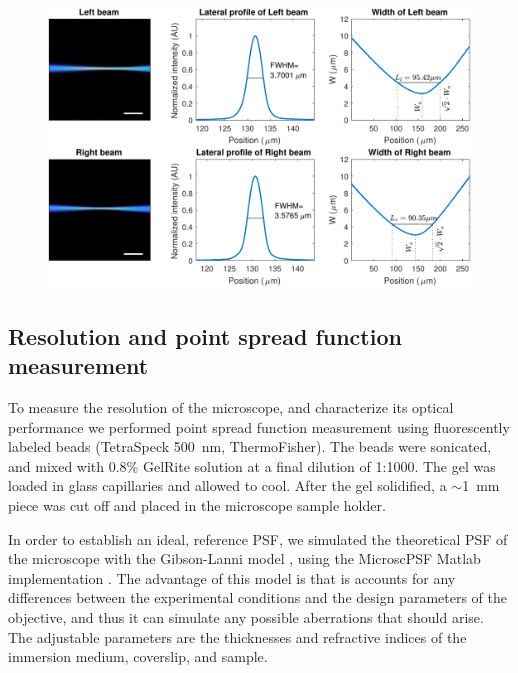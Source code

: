     \begin{figure}[htb]
      \centering
      \includegraphics[width=\textwidth]{beamPlots.pdf}
      \label{fig:beamProfiles}
    \end{figure}


  


  \subsection{Resolution and point spread function measurement}

    To measure the resolution of the microscope, and characterize its optical performance we performed point spread function measurement using fluorescently labeled beads (TetraSpeck \SI{500}{nm}, ThermoFisher). The beads were sonicated, and mixed with 0.8\% GelRite solution at a final dilution of 1:1000. The gel was loaded in glass capillaries and allowed to cool. After the gel solidified, a $\sim$\SI{1}{mm} piece was cut off and placed in the microscope sample holder.

    In order to establish an ideal, reference PSF, we simulated the theoretical PSF of the microscope with the Gibson-Lanni model \cite{gibson_experimental_1992}, using the MicroscPSF Matlab implementation \cite{li_fast_2017}. The advantage of this model is that is accounts for any differences between the experimental conditions and the design parameters of the objective, and thus it can simulate any possible aberrations that should arise. The adjustable parameters are the thicknesses and refractive indices of the immersion medium, coverslip, and sample. 

